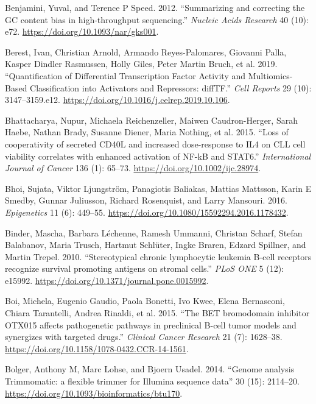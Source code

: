 \documentclass[11pt, a4paper, twosided]{book}
\newenvironment{CSLReferences}%
  {}%
  {\par}
\begin{document}
\begin{CSLReferences}{1}{0}
\leavevmode{}%
Benjamini, Yuval, and Terence P Speed. 2012. {``{Summarizing and correcting the GC content bias in high-throughput sequencing.}''} \emph{Nucleic Acids Research} 40 (10): e72. \url{https://doi.org/10.1093/nar/gks001}.

\leavevmode{}%
Berest, Ivan, Christian Arnold, Armando Reyes-Palomares, Giovanni Palla, Kasper Dindler Rasmussen, Holly Giles, Peter Martin Bruch, et al. 2019. {``{Quantification of Differential Transcription Factor Activity and Multiomics-Based Classification into Activators and Repressors: diffTF}.''} \emph{Cell Reports} 29 (10): 3147--3159.e12. \url{https://doi.org/10.1016/j.celrep.2019.10.106}.

\leavevmode{}%
Bhattacharya, Nupur, Michaela Reichenzeller, Maiwen Caudron-Herger, Sarah Haebe, Nathan Brady, Susanne Diener, Maria Nothing, et al. 2015. {``{Loss of cooperativity of secreted CD40L and increased dose-response to IL4 on CLL cell viability correlates with enhanced activation of NF-kB and STAT6}.''} \emph{International Journal of Cancer} 136 (1): 65--73. \url{https://doi.org/10.1002/ijc.28974}.

\leavevmode{}%
Bhoi, Sujata, Viktor Ljungström, Panagiotis Baliakas, Mattias Mattsson, Karin E Smedby, Gunnar Juliusson, Richard Rosenquist, and Larry Mansouri. 2016. \emph{Epigenetics} 11 (6): 449--55. \url{https://doi.org/10.1080/15592294.2016.1178432}.

\leavevmode{}%
Binder, Mascha, Barbara Léchenne, Ramesh Ummanni, Christan Scharf, Stefan Balabanov, Maria Trusch, Hartmut Schlüter, Ingke Braren, Edzard Spillner, and Martin Trepel. 2010. {``{Stereotypical chronic lymphocytic leukemia B-cell receptors recognize survival promoting antigens on stromal cells}.''} \emph{PLoS ONE} 5 (12): e15992. \url{https://doi.org/10.1371/journal.pone.0015992}.

\leavevmode{}%
Boi, Michela, Eugenio Gaudio, Paola Bonetti, Ivo Kwee, Elena Bernasconi, Chiara Tarantelli, Andrea Rinaldi, et al. 2015. {``{The BET bromodomain inhibitor OTX015 affects pathogenetic pathways in preclinical B-cell tumor models and synergizes with targeted drugs}.''} \emph{Clinical Cancer Research} 21 (7): 1628--38. \url{https://doi.org/10.1158/1078-0432.CCR-14-1561}.

\leavevmode{}%
Bolger, Anthony M, Marc Lohse, and Bjoern Usadel. 2014. {``{Genome analysis Trimmomatic: a flexible trimmer for Illumina sequence data}''} 30 (15): 2114--20. \url{https://doi.org/10.1093/bioinformatics/btu170}.


\end{CSLReferences}
\end{document}
